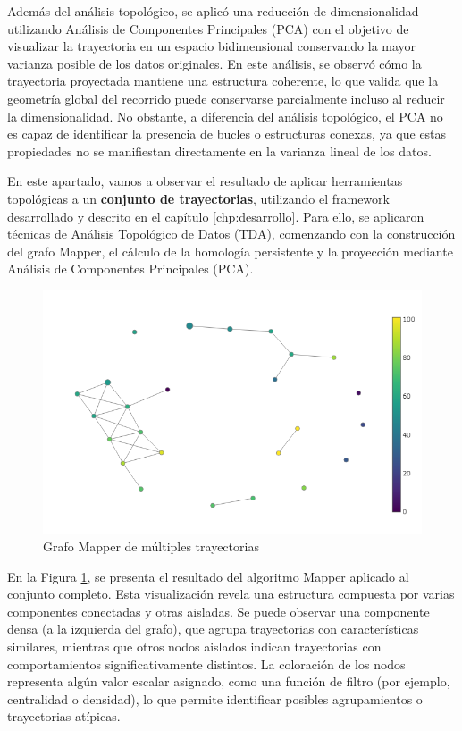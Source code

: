 Además del análisis topológico, se aplicó una reducción de dimensionalidad utilizando Análisis de Componentes Principales (PCA) con el objetivo de visualizar la trayectoria en un espacio bidimensional conservando la mayor varianza posible de los datos originales. En este análisis, se observó cómo la trayectoria proyectada mantiene una estructura coherente, lo que valida que la geometría global del recorrido puede conservarse parcialmente incluso al reducir la dimensionalidad. No obstante, a diferencia del análisis topológico, el PCA no es capaz de identificar la presencia de bucles o estructuras conexas, ya que estas propiedades no se manifiestan directamente en la varianza lineal de los datos.

En este apartado, vamos a observar el resultado de aplicar herramientas topológicas a un \textbf{conjunto de trayectorias}, utilizando el framework desarrollado y descrito en el capítulo \ref{chp:desarrollo}. Para ello, se aplicaron técnicas de Análisis Topológico de Datos (TDA), comenzando con la construcción del grafo Mapper, el cálculo de la homología persistente y la proyección mediante Análisis de Componentes Principales (PCA).

\begin{figure}[htbp]
    \centering
    \includegraphics[width=0.75\linewidth]{images/MAPPER_VARIAS.PNG}
    \caption{Grafo Mapper de múltiples trayectorias}
    \label{fig:grafo_mapper_varias}
\end{figure}

En la Figura \ref{fig:grafo_mapper_varias}, se presenta el resultado del algoritmo Mapper aplicado al conjunto completo. Esta visualización revela una estructura compuesta por varias componentes conectadas y otras aisladas. Se puede observar una componente densa (a la izquierda del grafo), que agrupa trayectorias con características similares, mientras que otros nodos aislados indican trayectorias con comportamientos significativamente distintos. La coloración de los nodos representa algún valor escalar asignado, como una función de filtro (por ejemplo, centralidad o densidad), lo que permite identificar posibles agrupamientos o trayectorias atípicas.

